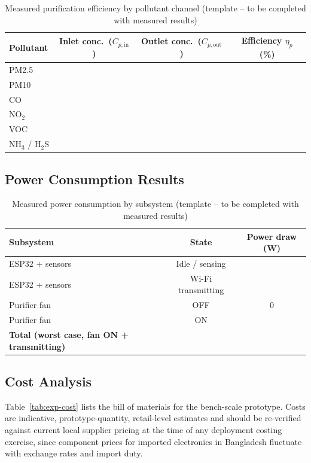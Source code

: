 \begin{table}[htbp]
\centering
\caption{Measured purification efficiency by pollutant channel (template -- to be completed with measured results)}
\label{tab:exp-purification-efficiency}
\begin{tabular}{@{}lccc@{}}
\toprule
\textbf{Pollutant} & \textbf{Inlet conc.\ ($C_{p,\text{in}}$)} & \textbf{Outlet conc.\ ($C_{p,\text{out}}$)} & \textbf{Efficiency $\eta_p$ (\%)} \\
\midrule
PM2.5 & \TODO{} & \TODO{} & \TODO{} \\
PM10 & \TODO{} & \TODO{} & \TODO{} \\
CO & \TODO{} & \TODO{} & \TODO{} \\
NO$_2$ & \TODO{} & \TODO{} & \TODO{} \\
VOC & \TODO{} & \TODO{} & \TODO{} \\
NH$_3$ / H$_2$S & \TODO{} & \TODO{} & \TODO{} \\
\bottomrule
\end{tabular}
\end{table}

\subsection{Power Consumption Results}
\label{sec:exp-power-result}
\begin{table}[htbp]
\centering
\caption{Measured power consumption by subsystem (template -- to be completed with measured results)}
\label{tab:exp-power}
\begin{tabular}{@{}lcc@{}}
\toprule
\textbf{Subsystem} & \textbf{State} & \textbf{Power draw (W)} \\
\midrule
ESP32 + sensors & Idle / sensing & \TODO{} \\
ESP32 + sensors & Wi-Fi transmitting & \TODO{} \\
Purifier fan & OFF & 0 \\
Purifier fan & ON & \TODO{} \\
\textbf{Total (worst case, fan ON + transmitting)} & & \TODO{} \\
\bottomrule
\end{tabular}
\end{table}

\subsection{Cost Analysis}
\label{sec:exp-cost}
Table~\ref{tab:exp-cost} lists the bill of materials for the bench-scale prototype. Costs are indicative, prototype-quantity, retail-level estimates and should be re-verified against current local supplier pricing at the time of any deployment costing exercise, since component prices for imported electronics in Bangladesh fluctuate with exchange rates and import duty.

